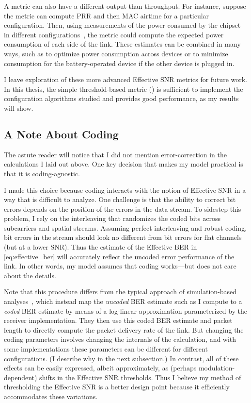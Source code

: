 A metric can also have a different output than throughput. For instance, suppose the metric can compute PRR and then MAC airtime for a particular configuration. Then, using measurements of the power consumed by the chipset in different configurations~\cite{Halperin_Power}, the metric could compute the expected power consumption of each side of the link. These estimates can be combined in many ways, such as to optimize power consumption across devices or to minimize consumption for the battery-operated device if the other device is plugged in.

I leave exploration of these more advanced Effective SNR metrics for future work. In this thesis, the simple threshold-based metric () is sufficient to implement the configuration algorithms studied and provides good performance, as my results will show.

\subsection{A Note About Coding}
The astute reader will notice that I did not mention error-correction in the calculations I laid out above. One key decision that makes my model practical is that it is coding-agnostic.

I made this choice because coding interacts with the notion of Effective SNR in a way that is difficult to analyze. One challenge is that the ability to correct bit errors depends on the position of the errors in the data stream. To sidestep this problem, I rely on the interleaving that randomizes the coded bits across subcarriers and spatial streams. Assuming perfect interleaving and robust coding, bit errors in the stream should look no different from bit errors for flat channels (but at a lower SNR). Thus the estimate of the Effective BER in \eqref{eq:effective_ber} will accurately reflect the uncoded error performance of the link. In other words, my model assumes that coding works---but does not care about the details.

Note that this procedure differs from the typical approach of simulation-based analyses~\cite{Kant_FLA, Liu_EESM, Nortel_3g}, which instead map the \emph{uncoded} BER estimate such as I compute to a \emph{coded} BER estimate by means of a log-linear approximation parameterized by the receiver implementation. They then use this coded BER estimate and packet length to directly compute the packet delivery rate of the link. But changing the coding parameters involves changing the internals of the calculation, and with some implementations these parameters can be different for different configurations. (I describe why in the next subsection.) In contrast, all of these effects can be easily expressed, albeit approximately, as (perhaps modulation-dependent) shifts in the Effective SNR thresholds. Thus I believe my method of thresholding the Effective SNR is a better design point because it efficiently accommodates these variations.


